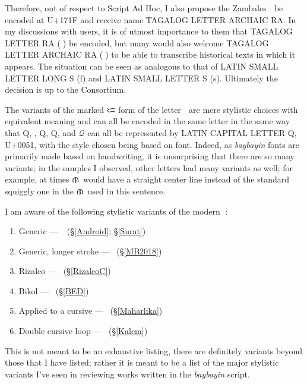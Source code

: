 \documentclass[a4paper,pagesize,openany,14pt,parskip=never]{scrbook}
\newcommand{\≈}{$\approx$}
\newcommand{\ra}{{\baybayin ᜍ}}
\newcommand{\na}{{\baybayin ᜈ}}
\newcommand{\rizaleoRA}{{\baybayinb \symbol{"E005}}}
\newcommand{\cochinQ}{{\cochin Q}}
\begin{document}
Therefore, out of respect to Script Ad Hoc, I also propose the Zambales {\baybayinh ᜍ} be encoded at U+171F and receive name \textsf{TAGALOG LETTER ARCHAIC RA}. In my discussions with users, it is of utmost importance to them that \textsf{TAGALOG LETTER RA} (\ra) be encoded, but many would also welcome \textsf{TAGALOG LETTER ARCHAIC RA} ({\baybayinh ᜍ}) to be able to transcribe historical texts in which it appears. The situation can be seen as analogous to that of \textsf{LATIN SMALL LETTER LONG S} (ſ) and \textsf{LATIN SMALL LETTER S} (s). Ultimately the decision is up to the Consortium.

The variants of the marked {\baybayin ᜇ} form of the letter {\baybayin ᜍ} are mere stylistic choices with equivalent meaning and can all be encoded in the same letter in the same way that Q, {}, \textsf{Q}, \cochinQ, and $\mathscr{Q}$ can all be represented by \textsf{LATIN CAPITAL LETTER Q}, U+0051, with the style chosen being based on font. Indeed, as {\em baybayin} fonts are primarily made based on handwriting, it is unsurprising that there are so many variants; in the samples I observed, other letters had many variants as well; for example, at times \na\ would have a straight center line instead of the standard squiggly one in the \na\ used in this sentence.

I am aware of the following stylistic variants of the modern \ra:

\begin{enumerate}
    \item Generic --- \ra\ (\S\ref{Android}; \S\ref{Surat})
    \item Generic, longer stroke --- {\baybayinb {}}\ (\S\ref{MB2018})
    \item Rizaleo --- \rizaleoRA\ (\S\ref{RizaleoC})
    \item Bikol --- {\baybayinb {}}\ (\S\ref{BED})
    \item Applied to a cursive {\baybayinb {}} --- {\baybayinb {}}\ (\S\ref{Maharlika})
    \item\label{DoubleLoop} Double cursive loop --- {\baybayinb {}}\ (\S\ref{Kalem})
\end{enumerate}

This is not meant to be an exhaustive listing, there are definitely variants beyond those that I have listed; rather it is meant to be a list of the major stylistic variants I've seen in reviewing works written in the {\em baybayin} script.
\end{document}
